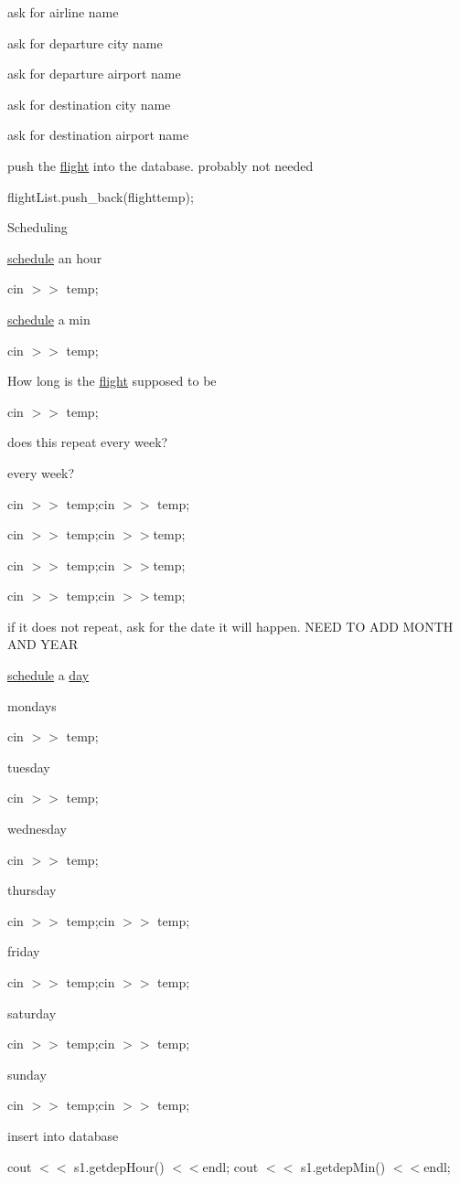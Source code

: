 ask for airline name

ask for departure city name

ask for departure airport name

ask for destination city name

ask for destination airport name

push the \hyperlink{classflight}{flight} into the database. probably not needed

flightList.push\_\-back(flighttemp);

Scheduling

\hyperlink{classschedule}{schedule} an hour

cin $>$$>$ temp;

\hyperlink{classschedule}{schedule} a min

cin $>$$>$ temp;

How long is the \hyperlink{classflight}{flight} supposed to be

cin $>$$>$ temp;

does this repeat every week?

every week?

cin $>$$>$ temp;cin $>$$>$ temp;

cin $>$$>$ temp;cin $>$$>$temp;

cin $>$$>$ temp;cin $>$$>$temp;

cin $>$$>$ temp;cin $>$$>$temp;

if it does not repeat, ask for the date it will happen. NEED TO ADD MONTH AND YEAR

\hyperlink{classschedule}{schedule} a \hyperlink{classday}{day}

mondays

cin $>$$>$ temp;

tuesday

cin $>$$>$ temp;

wednesday

cin $>$$>$ temp;

thursday

cin $>$$>$ temp;cin $>$$>$ temp;

friday

cin $>$$>$ temp;cin $>$$>$ temp;

saturday

cin $>$$>$ temp;cin $>$$>$ temp;

sunday

cin $>$$>$ temp;cin $>$$>$ temp;

insert into database

cout $<$$<$ s1.getdepHour() $<$$<$endl; cout $<$$<$ s1.getdepMin() $<$$<$endl;


